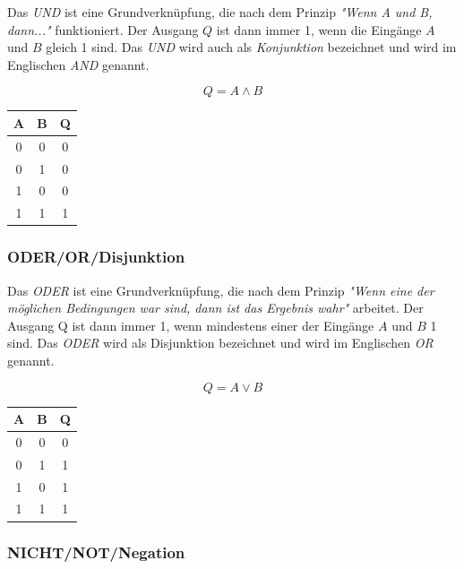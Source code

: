 \documentclass[a4paper, 12pt]{report}
\begin{document}
\begin{multicols}{2}
Das \emph{UND} ist eine Grundverknüpfung, die nach dem Prinzip
\emph{"Wenn A und B, dann..."} funktioniert. Der Ausgang $Q$ ist dann immer 1,
wenn die Eingänge $A$ und $B$ gleich 1 sind. Das \emph{UND} wird auch als
\emph{Konjunktion} bezeichnet und wird im Englischen \emph{AND} genannt.

\begin{center}
    \begin{equation}
	Q = A \land B
    \end{equation}
    \begin{tabular}{ | c | c || c | }
    	\hline
    	A & B & Q \\ \hline
    	0 & 0 & 0 \\ \hline
    	0 & 1 & 0 \\ \hline
    	1 & 0 & 0 \\ \hline
    	1 & 1 & 1 \\
    	\hline
    \end{tabular}
\end{center}

\subsubsection{ODER/OR/Disjunktion}

Das \emph{ODER} ist eine Grundverknüpfung, die nach dem Prinzip
\emph{"Wenn eine der möglichen Bedingungen war sind, dann ist das Ergebnis
wahr"} arbeitet. Der Ausgang Q ist dann immer 1, wenn mindestens einer der
Eingänge $A$ und $B$ 1 sind. Das \emph{ODER} wird als Disjunktion bezeichnet
und wird im Englischen \emph{OR} genannt.

\begin{center}
    \begin{equation}
	Q = A \lor B
    \end{equation}
   \begin{tabular}{ | c | c || c | }
    	\hline
    	A & B & Q \\ \hline
    	0 & 0 & 0 \\ \hline
    	0 & 1 & 1 \\ \hline
    	1 & 0 & 1 \\ \hline
    	1 & 1 & 1 \\
    	\hline
    \end{tabular}
\end{center}

\subsubsection{NICHT/NOT/Negation}


\end{multicols}
\end{document}
